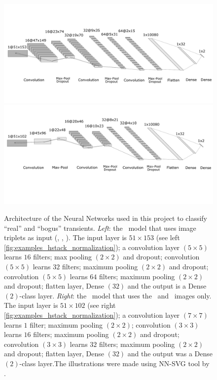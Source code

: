 \begin{figure}

   \centering
   \includegraphics[width=0.45\linewidth]{
    figures/aaa_big.pdf}
    \includegraphics[width=0.45\linewidth]{figures/ccc_bug.pdf}
   \caption{Architecture of the Neural Networks used in this project to classify ``real'' and ``bogus'' transients. {\it Left}: the \diabased\ model that uses image triplets as input (\diff, \temp, \search). The input layer is $51 \times 153$ (see left \autoref{fig:examples_hstack_normalization}); a convolution layer $(5\times 5)$ learns $16$ filters; max pooling $(2\times2)$ and dropout; convolution $(5\times 5)$ learns $32$ filters;  maximum pooling $(2\times2)$ and dropout; convolution $(5\times 5)$ learns $64$ filters;  maximum pooling $(2\times2)$ and dropout; flatten layer, Dense $(32)$ and the output is a Dense $(2)$-class layer. {\it Right}: the \nodia\ model that uses the \temp\ and \search\ images only. The input layer is $51 \times 102$ (see right \autoref{fig:examples_hstack_normalization}); a convolution layer $(7\times 7)$ learns $1$ filter; maximum pooling $(2\times2)$; convolution $(3\times 3)$ learns $16$ filters;  maximum pooling $(2\times2)$ and dropout; convolution $(3\times 3)$ learns $32$ filters;  maximum pooling $(2\times2)$ and dropout; flatten layer, Dense $(32)$ and the output was a Dense $(2)$-class layer.The illustrations were made using NN-SVG tool by \citet{LeNail2019}.}
\label{fig:architecturesCNN}
\end{figure}


